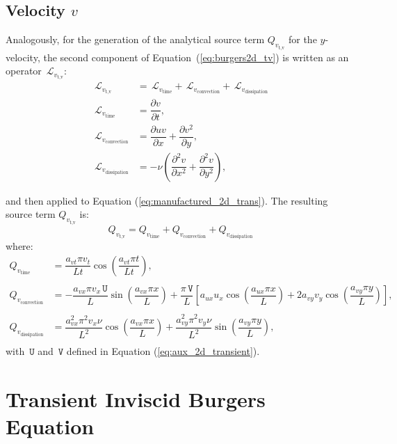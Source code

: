 \documentclass[10pt]{article}
\newcommand{\diff}[2] {\dfrac{\partial #1}{\partial #2}}
\newcommand{\Lo}{\,\mathcal{L}}
\newcommand{\U}{\,\mathtt{U}}
\newcommand{\V}{\,\mathtt{V}}
\begin{document}
\subsection{Velocity $v$}
Analogously, for the generation of the analytical source term $Q_{v_\text{t,v}}$ for the $y$-velocity, the second component of  Equation~(\ref{eq:burgers2d_tv}) is written as an  operator $\Lo_{v_\text{t,v}}$:
\begin{equation*}
\begin{split}
\Lo_{v_\text{t,v}}&= \Lo_{v_\text{time}}+\Lo_{v_\text{convection}}+\Lo_{v_\text{dissipation}}\\
\Lo_{v_\text{time}}&=\diff{ v}{t},\\
\Lo_{v_\text{convection}}&=\diff{ u v}{x} + \diff{  v^2 }{y},\\
\Lo_{v_\text{dissipation}}&=-\nu \left( \diff{^2v}{ x^2}+ \diff{^2v }{y^2}\right),
\end{split}
\end{equation*}


and then applied to Equation  (\ref{eq:manufactured_2d_trans}).  The resulting source term $Q_{v_\text{t,v}}$ is:
$$Q_{v_\text{t,v}}= Q_{v_\text{time}}+Q_{v_\text{convection}}+Q_{v_\text{dissipation}}$$
where:
\begin{equation}
\begin{split}
Q_{v_\text{time}} &=\dfrac{ a_{vt} \pi v_t }{Lt}\cos\left(\dfrac{a_{vt} \pi t}{Lt}\right), \\  
%
&\\
%
 Q_{v_\text{convection}} &= -\dfrac{a_{vx} \pi v_x \U}{L} \sin\left(\dfrac{a_{vx} \pi x}{L}\right)+\dfrac{ \pi \V}{L}\left[a_{ux} u_x \cos\left(\dfrac{a_{ux} \pi x}{L}\right)+2 a_{vy} v_y \cos\left(\dfrac{a_{vy} \pi y}{L}\right)\right] , \\  
%
&\\
%
 Q_{v_\text{dissipation}} &= \dfrac{a_{vx}^2 \pi^2 v_x \nu }{L^2}\cos\left(\dfrac{a_{vx} \pi x}{L}\right)+\dfrac{a_{vy}^2 \pi^2 v_y \nu }{L^2}\sin\left(\dfrac{a_{vy} \pi y}{L}\right), \\  
\end{split}
\end{equation}
with $\U$ and $\V$ defined in Equation (\ref{eq:aux_2d_transient}).

\section{Transient Inviscid Burgers Equation}
\end{document}
